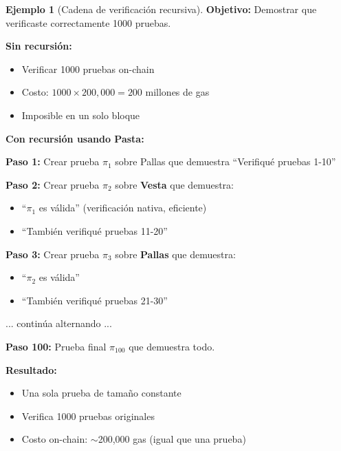 \documentclass[11pt,a4paper,twoside,openright]{book}
\theoremstyle{definition}
\newtheorem{example}{Ejemplo}[chapter]
\theoremstyle{plain}
\theoremstyle{remark}
\begin{document}
\begin{example}[Cadena de verificación recursiva]
\textbf{Objetivo:} Demostrar que verificaste correctamente 1000 pruebas.

\textbf{Sin recursión:}
\begin{itemize}
    \item Verificar 1000 pruebas on-chain
    \item Costo: $1000 \times 200,000 = 200$ millones de gas
    \item Imposible en un solo bloque
\end{itemize}

\textbf{Con recursión usando Pasta:}

\textbf{Paso 1:} Crear prueba $\pi_1$ sobre Pallas que demuestra ``Verifiqué pruebas 1-10''

\textbf{Paso 2:} Crear prueba $\pi_2$ sobre \textbf{Vesta} que demuestra:
\begin{itemize}
    \item ``$\pi_1$ es válida'' (verificación nativa, eficiente)
    \item ``También verifiqué pruebas 11-20''
\end{itemize}

\textbf{Paso 3:} Crear prueba $\pi_3$ sobre \textbf{Pallas} que demuestra:
\begin{itemize}
    \item ``$\pi_2$ es válida''
    \item ``También verifiqué pruebas 21-30''
\end{itemize}

... continúa alternando ...

\textbf{Paso 100:} Prueba final $\pi_{100}$ que demuestra todo.

\textbf{Resultado:}
\begin{itemize}
    \item Una sola prueba de tamaño constante
    \item Verifica 1000 pruebas originales
    \item Costo on-chain: $\sim$200,000 gas (igual que una prueba)
\end{itemize}
\end{example}
\end{document}
